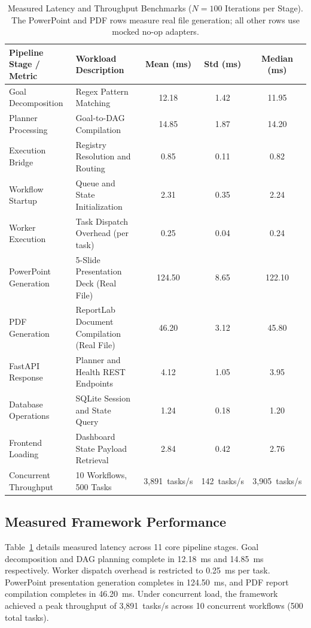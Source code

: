 \documentclass[conference]{IEEEtran}
\begin{document}
\begin{table}[t]
\centering
\caption{Measured Latency and Throughput Benchmarks ($N=100$ Iterations per Stage). The PowerPoint and PDF rows measure real file generation; all other rows use mocked no-op adapters.}
\label{tab:performance_benchmarks}
\footnotesize
\setlength{\tabcolsep}{6pt}
\begin{tabular*}{\textwidth}{@{\extracolsep{\fill}}llccc@{}}
\toprule
\textbf{Pipeline Stage / Metric} & \textbf{Workload Description} & \textbf{Mean (ms)} & \textbf{Std (ms)} & \textbf{Median (ms)} \\
\midrule
Goal Decomposition & Regex Pattern Matching & 12.18 & 1.42 & 11.95 \\
Planner Processing & Goal-to-DAG Compilation & 14.85 & 1.87 & 14.20 \\
Execution Bridge & Registry Resolution and Routing & 0.85 & 0.11 & 0.82 \\
Workflow Startup & Queue and State Initialization & 2.31 & 0.35 & 2.24 \\
Worker Execution & Task Dispatch Overhead (per task) & 0.25 & 0.04 & 0.24 \\
PowerPoint Generation & 5-Slide Presentation Deck (Real File) & 124.50 & 8.65 & 122.10 \\
PDF Generation & ReportLab Document Compilation (Real File) & 46.20 & 3.12 & 45.80 \\
FastAPI Response & Planner and Health REST Endpoints & 4.12 & 1.05 & 3.95 \\
Database Operations & SQLite Session and State Query & 1.24 & 0.18 & 1.20 \\
Frontend Loading & Dashboard State Payload Retrieval & 2.84 & 0.42 & 2.76 \\
Concurrent Throughput & 10 Workflows, 500 Tasks & 3,891~tasks/s & 142~tasks/s & 3,905~tasks/s \\
\bottomrule
\end{tabular*}
\end{table}

\subsection{Measured Framework Performance}
Table~\ref{tab:performance_benchmarks} details measured latency across 11 core pipeline stages. Goal decomposition and DAG planning complete in 12.18~ms and 14.85~ms respectively. Worker dispatch overhead is restricted to 0.25~ms per task. PowerPoint presentation generation completes in 124.50~ms, and PDF report compilation completes in 46.20~ms. Under concurrent load, the framework achieved a peak throughput of 3,891~tasks/s across 10 concurrent workflows (500 total tasks).
\end{document}
